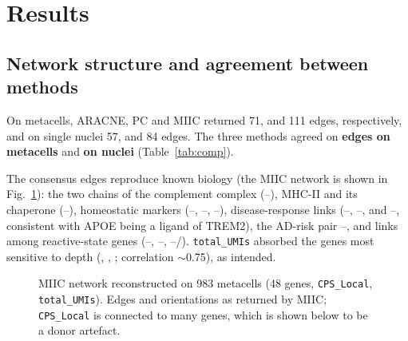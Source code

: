 \section{Results}
\subsection{Network structure and agreement between methods}
On metacells, ARACNE, PC and MIIC returned 71, \pcEdgesMeta{} and 111 edges, respectively, and on single nuclei 57, \pcEdgesNuc{} and 84 edges. The three methods agreed on \textbf{\consMeta{} edges on metacells} and \textbf{\consNuc{} on nuclei} (Table~\ref{tab:comp}).\pcbug{}

The consensus edges reproduce known biology (the MIIC network is shown in Fig.~\ref{fig:miic_meta}): the two chains of the complement complex (--), MHC-II and its chaperone (--), homeostatic markers (--, --, --), disease-response links (--, --, and --, consistent with APOE being a ligand of TREM2), the AD-risk pair --, and links among reactive-state genes (--, --, --/). \texttt{total\_UMIs} absorbed the genes most sensitive to depth (, , ; correlation $\sim$0.75), as intended.

\begin{figure}[ht]
\centering
\caption{MIIC network reconstructed on 983 metacells (48 genes, \texttt{CPS\_Local}, \texttt{total\_UMIs}). Edges and orientations as returned by MIIC; \texttt{CPS\_Local} is connected to many genes, which is shown below to be a donor artefact.}\label{fig:miic_meta}
\end{figure}

